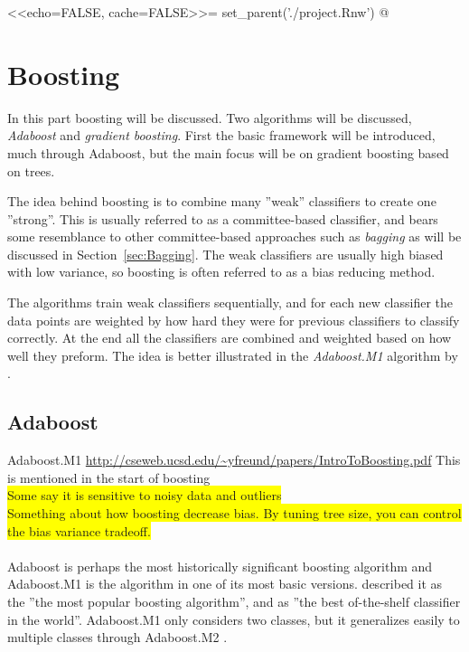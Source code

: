 <<echo=FALSE, cache=FALSE>>=
set_parent('./project.Rnw')
@
\section{Boosting}
\label{sec:Boosting}
In this part boosting will be discussed. Two algorithms will be discussed, \textit{Adaboost} and \textit{gradient boosting}. First the basic framework will be introduced, much through Adaboost, but the main focus will be on gradient boosting based on trees. 

The idea behind boosting is to combine many ''weak'' classifiers to create one ''strong''. This is usually referred to as a committee-based classifier, and bears some resemblance to other committee-based approaches such as \textit{bagging} as will be discussed in Section~\ref{sec:Bagging}. The weak classifiers are usually high biased with low variance, so boosting is often referred to as a bias reducing method. 

The algorithms train weak classifiers sequentially, and for each new classifier the data points are weighted by how hard they were for previous classifiers to classify correctly. At the end all the classifiers are combined and weighted based on how well they preform. The idea is better illustrated in the \textit{Adaboost.M1} algorithm by  \cite{adaboostM1}.
\subsection{Adaboost}
\label{sub:Adaboost}
Adaboost.M1 \url{http://cseweb.ucsd.edu/~yfreund/papers/IntroToBoosting.pdf} This is mentioned in the start of boosting \cite{modstat} \\
\colorbox{yellow}{Some say it is sensitive to noisy data and outliers}\\
\colorbox{yellow}{Something about how boosting decrease bias. By tuning tree size, you can control the bias variance tradeoff.}\\
\\
Adaboost is perhaps the most historically significant boosting algorithm and Adaboost.M1 is the algorithm in one of its most basic versions. \cite{modstat} described it as the ''the most popular boosting algorithm'', and \cite{Breiman1996} as ''the best of-the-shelf classifier in the world''. Adaboost.M1 only considers two classes, but it generalizes easily to multiple classes through Adaboost.M2 \cite{adaboostM1}. 

